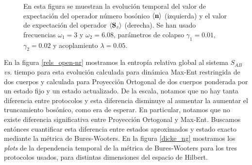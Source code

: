 \documentclass{report} %
\numberwithin{equation}{section}
\begin{document}
\begin{figure}
    \centering
    \qquad
    \caption{En esta figura se muestran la evolución temporal del valor de expectación del operador número bosónico $\langle {\bf n} \rangle $ (izquierda) y el valor de expectación del operador $\langle {\bf S}_z \rangle$ (derecha). Se han usado  frecuencias $\omega_1 = 3$ y $\omega_2 = 6.08$, parámetros de colapso $\gamma_1 = 0.01$, $\gamma_2 = 0.02$ y acoplamiento $\lambda = 0.05$.}
    \label{results_open-nr}
\end{figure}

En la figura \ref{rels_open-nr} mostramos la entropía relativa global al sistema $S_{AB}$ \textit{vs.} tiempo para esta evolución calculada para dinámica Max-Ent restringida de dos cuerpos y calculada para Proyección Ortogonal de dos cuerpos ponderada por un estado fijo y un estado actualizado. 
De la escala, notamos que no hay tanta diferencia entre protocolos y esta diferencia disminuye al aumentar la aumentar el truncamiento bosónico, como era de esperar. En particular, notamos que no existe diferencia significativa entre Proyección Ortogonal y Max-Ent. Buscamos entónces cuantificar esta diferencia entre estados aproximados y estado exacto mediante la métrica de Bures-Wooters. En la figura \ref{dicke_ng} mostramos los \textit{plots} de la dependencia temporal de la métrica de Bures-Wooters para los tres protocolos usados, para distintas dimensiones del espacio de Hilbert.
\end{document}
